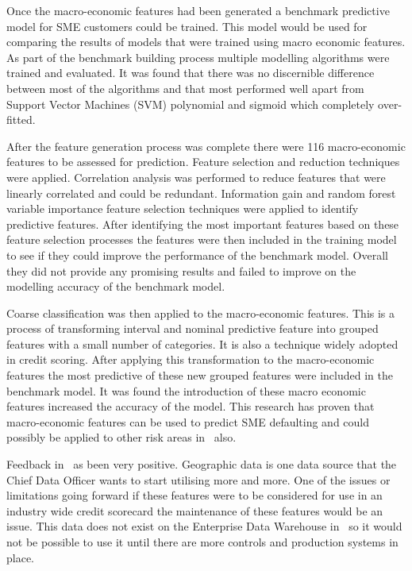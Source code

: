 Once the macro-economic features had been generated a benchmark  predictive model for SME customers could be trained. This model would be used for comparing the results of models that were trained using macro economic features. As part of the benchmark building process multiple modelling algorithms were trained and evaluated. It was found that there was no discernible difference between most of the algorithms and that most performed well apart from Support Vector Machines (SVM) polynomial and sigmoid which completely over-fitted.  

After the feature generation process was complete there were 116 macro-economic features to be assessed for prediction. Feature selection and reduction techniques were applied. Correlation analysis was performed to reduce features that were linearly correlated and could be redundant. Information gain and random forest variable importance feature selection techniques were applied to identify predictive features. After identifying the most important features based on these feature selection processes the features were then included in the training model to see if they could improve the performance of the benchmark model. Overall they did not provide any promising results and failed to improve on the modelling accuracy of the benchmark model.

Coarse classification was then applied to the macro-economic features. This is a process of transforming interval and nominal predictive feature into grouped features with a small number of categories. It is also a technique widely adopted in credit scoring. After applying this transformation to the macro-economic features the most predictive of these new grouped features were included in the benchmark model. It was found the introduction of these macro economic features increased the accuracy of the model. This research has proven that macro-economic features can be used to predict SME defaulting and could possibly be applied to other risk areas in \subjectname\ also.

Feedback in \subjectname\ as been very positive. Geographic data is one data source that the Chief Data Officer wants to start utilising more and more. One of the issues or limitations going forward if these features were to be considered for use in an industry wide credit scorecard the maintenance of these features would be an issue. This data does not exist on the Enterprise Data Warehouse in \subjectname\ so it would not be possible to use it until there are more controls and production systems in place. 



